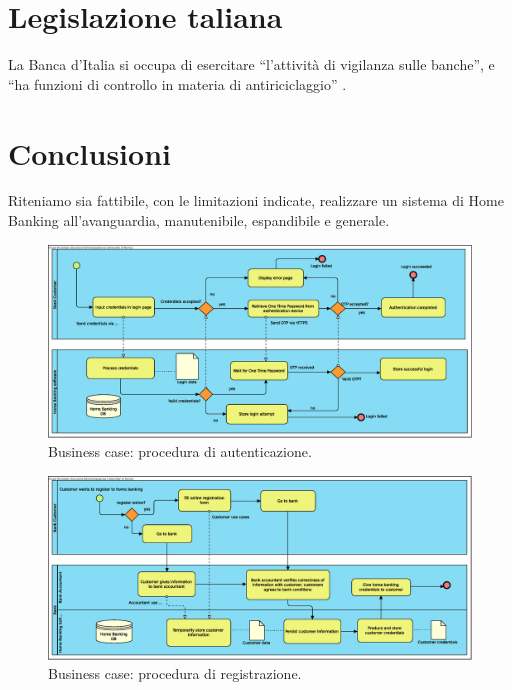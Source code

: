 \documentclass[10pt]{softeng} %
\begin{document}
\section{Legislazione taliana}

La Banca d'Italia si occupa di esercitare ``l'attivit\`a di vigilanza sulle banche'', e ``ha funzioni di controllo in materia di antiriciclaggio'' \cite[Funzioni]{banca_italia}.

\section{Conclusioni}

Riteniamo sia fattibile, con le limitazioni indicate, realizzare un sistema di Home Banking all'avanguardia, manutenibile, espandibile e generale.


\printcustombib{}


\begin{figure}[hbt]
	\centering
	\includegraphics[width=\textheight, angle=90]{Images/Authentication.eps}
	\caption{Business case: procedura di autenticazione.}
	\label{fig:business_case_authentication}
\end{figure}

\begin{figure}[hbt]
	\centering
	\includegraphics[width=\textheight, angle=90]{Images/Home_Banking_registration.eps}
	\caption{Business case: procedura di registrazione.}
	\label{fig:business_case_registration}
\end{figure}
\end{document}
